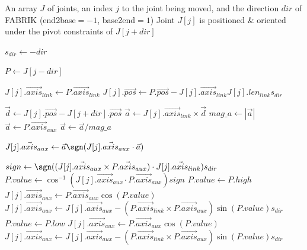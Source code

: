 \begin{algorithm}
\caption{Move Joint under Pivot Constraints}
\label{alg:move_pivot}
\footnotesize{
\begin{algorithmic}[1]
    \Require An array $J$ of joints, an index $j$ to the joint being moved, and the direction $dir$ of FABRIK (end2base$=-1$, base2end$=1$)
    \Ensure Joint $J[j]$ is positioned \& oriented under the pivot constraints of $J[j+dir]$

        \State $s_{dir}\gets -dir$
        \Statex

        \State $P\gets J[j-dir]$
        \Statex

        \State $J[j].\vec{axis}_{link}\gets P.\vec{axis}_{link}$
        \State $J[j].\vec{pos}\gets P.\vec{pos}-J[j].\vec{axis}_{link}J[j].len_{link}s_{dir}$
        \Statex

        \State $\vec{d}\gets J[j].\vec{pos}-J[j+dir].\vec{pos}$
        \State $\vec{a}\gets J[j].\vec{axis}_{link}\times\vec{d}$
        \State $mag\_a\gets|\vec{a}|$
            \State $\vec{a}\gets P.\vec{axis}_{aux}$
        \Else
            \State $\vec{a}\gets\vec{a}/mag\_a$
        \EndIf
        \Statex

        \State $J[j].\vec{axis}_{aux}\gets\vec{a}\sgn(J[j].\vec{axis}_{aux}\cdot\vec{a})$
        \Statex

        \State $sign\gets\sgn((J[j].\vec{axis}_{aux}\times P.\vec{axis}_{aux})\cdot J[j].\vec{axis}_{link})s_{dir}$
        \State $P.value\gets\cos^{-1}(J[j].\vec{axis}_{aux}\cdot P.\vec{axis}_{aux})sign$
                \State $P.value\gets P.high$
                \State $J[j].\vec{axis}_{aux}\gets P.\vec{axis}_{aux}\cos(P.value)$
                \State $J[j].\vec{axis}_{aux}\gets J[j].\vec{axis}_{aux}-(P.\vec{axis}_{link}\times P.\vec{axis}_{aux})\sin(P.value)s_{dir}$
                \State $P.value\gets P.low$
                \State $J[j].\vec{axis}_{aux}\gets P.\vec{axis}_{aux}\cos(P.value)$
                \State $J[j].\vec{axis}_{aux}\gets J[j].\vec{axis}_{aux}-(P.\vec{axis}_{link}\times P.\vec{axis}_{aux})\sin(P.value)s_{dir}$
            \EndIf
        \EndIf
    \EndFunction
\end{algorithmic}
}
\end{algorithm}

